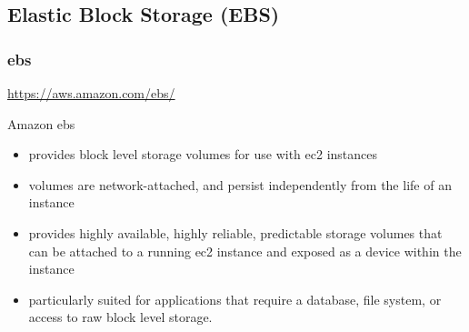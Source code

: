 \documentclass{beamer}
\begin{document}
\subsection{Elastic Block Storage (EBS)}
\begin{frame}
\frametitle[\gls{ebs}]{\acrfull{ebs}}
\url{https://aws.amazon.com/ebs/}

  Amazon \gls{ebs}
  \begin{itemize}
  \item provides block level storage volumes for use with \gls{ec2} instances
  \item volumes are network-attached, and persist independently from the life of an instance
  \item provides highly available, highly reliable, predictable storage volumes that can be attached to a running \gls{ec2} instance and exposed as a device within the instance
  \item particularly suited for applications that require a database, file system, or access to raw block level storage.
  \end{itemize}
\end{frame}


\end{document}
